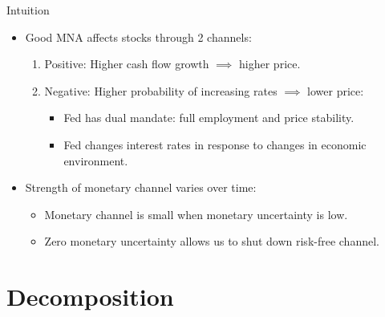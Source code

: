 \documentclass{beamer}
\begin{document}
\begin{frame}{Intuition}
\begin{itemize}
    \item {Good MNA affects stocks through 2 channels:}
    \begin{enumerate}
        \item {Positive: Higher cash flow growth $\implies$ higher price.}
        \item {Negative: Higher probability of increasing rates $\implies$ lower price:}
        \begin{itemize}
                \item {Fed has dual mandate: full employment and price stability.}
                \item {Fed changes interest rates in response to changes in economic environment.}
        \end{itemize}
    \end{enumerate}
    \item {Strength of monetary channel varies over time:}
    \begin{itemize}
    \item {Monetary channel is small when monetary uncertainty is low.}
    \item {Zero monetary uncertainty allows us to shut down risk-free channel.}
    \end{itemize}
\end{itemize}
\end{frame}


\section{Decomposition}
\subsection{}
\end{document}
